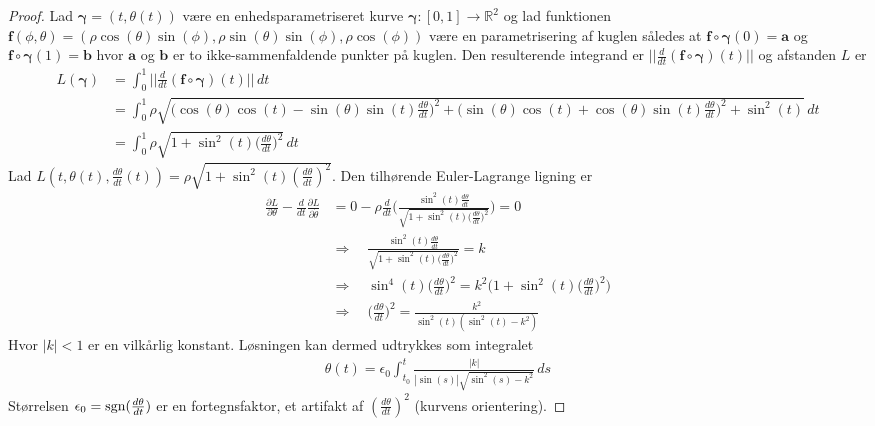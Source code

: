 \begin{proof}
Lad ${\boldsymbol \gamma} =(t, \theta(t)) $ være en enhedsparametriseret kurve ${\boldsymbol \gamma} : [0,1] \rightarrow \mathbb{R}^2$ og lad funktionen $\mathbf{f}(\phi,\theta) = (\rho\cos(\theta)\sin(\phi), \rho\sin(\theta)\sin(\phi), \rho\cos(\phi))$ være en parametrisering af kuglen således at $\mathbf{f} \circ {\boldsymbol \gamma}(0)=\mathbf{a}$ og $\mathbf{f} \circ {\boldsymbol \gamma}(1)=\mathbf{b}$ hvor $\mathbf{a}$ og $\mathbf{b}$ er to ikke-sammenfaldende punkter på kuglen. Den resulterende integrand er $|| \frac{d}{dt}(\mathbf{f} \circ {\boldsymbol \gamma})(t) ||$ og afstanden $L$ er
\begin{align*}
L({\boldsymbol \gamma}) &= \int_0^1 ||\frac{d}{dt}(\mathbf{f} \circ {\boldsymbol \gamma})(t) || \, dt \\
&= \int_0^1 \rho\sqrt{\big( \cos(\theta)\cos(t)-\sin(\theta)\sin(t) \frac{d\theta}{dt} \big)^2 + \big(\sin(\theta)\cos(t)+\cos(\theta)\sin(t) \frac{d\theta}{dt} \big)^2 + \sin^2(t)} \, dt\\
&= \int_0^1 \rho\sqrt{1+\sin^2(t) \big(\frac{d\theta}{dt} \big)^2} \, dt
\end{align*}
Lad $L(t,\theta(t),\frac{d\theta}{dt}(t))= \rho\sqrt{1+\sin^2(t) (\frac{d\theta}{dt})^2}$. Den tilhørende Euler-Lagrange ligning er
\begin{align*}
\frac{\partial L}{\partial \theta} - \frac{d}{dt} \frac{\partial L}{\partial \dot{\theta}} &= 0-\rho \frac{d}{dt}\Big( \frac{\sin^2(t)\frac{d\theta}{dt}}{\sqrt{1+\sin^2(t) \big(\frac{d\theta}{dt} \big)^2}} \Big) = 0 \\
&\Rightarrow \quad \frac{\sin^2(t)\frac{d\theta}{dt}}{\sqrt{1+\sin^2(t) \big(\frac{d\theta}{dt} \big)^2}} = k \\
&\Rightarrow \quad
\sin^4(t)\big(\frac{d\theta}{dt} \big)^2 = k^2 \Big( 1+\sin^2(t) \big(\frac{d\theta}{dt} \big)^2 \Big) \\
&\Rightarrow \quad
\big(\frac{d\theta}{dt} \big)^2 = \frac{k^2}{\sin^2(t)(\sin^2(t)-k^2)}
\end{align*}
Hvor $|k|<1$ er en vilkårlig konstant. Løsningen kan dermed udtrykkes som integralet
\begin{align*}
\theta(t) = \epsilon_0 \int_{t_0}^t \frac{|k|}{|\sin(s)|\sqrt{\sin^2(s)-k^2}} \, ds
\end{align*}
Størrelsen $\epsilon_0 = \textnormal{sgn}(\frac{d\theta}{dt}) $ er en fortegnsfaktor, et artifakt af $(\frac{d\theta}{dt})^2$ (kurvens orientering).



\end{proof}
